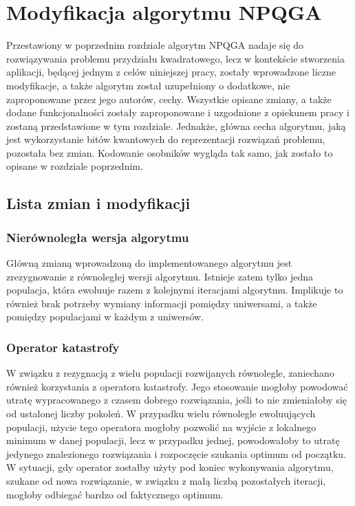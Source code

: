 \chapter{Modyfikacja algorytmu NPQGA}
\label{cha:modyfikacja}
Przestawiony w poprzednim rozdziale algorytm NPQGA nadaje się do rozwiązywania problemu przydziału kwadratowego, lecz w kontekście stworzenia aplikacji, będącej jednym z celów niniejszej pracy, zostały wprowadzone liczne modyfikacje, a także algorytm został uzupełniony o dodatkowe, nie zaproponowane przez jego autorów, cechy. Wszystkie opisane zmiany, a także dodane funkcjonalności zostały zaproponowane i uzgodnione z opiekunem pracy i zostaną przedstawione w tym rozdziale. Jednakże, główna cecha algorytmu, jaką jest wykorzystanie bitów kwantowych do reprezentacji rozwiązań problemu, pozostała bez zmian. Kodowanie osobników wygląda tak samo, jak zostało to opisane w rozdziale poprzednim.

\section{Lista zmian i modyfikacji}
\subsection{Nierównoległa wersja algorytmu}
Główną zmianą wprowadzoną do implementowanego algorytmu jest zrezygnowanie z równoległej wersji algorytmu. Istnieje zatem tylko jedna populacja, która ewoluuje razem z kolejnymi iteracjami algorytmu. Implikuje to również brak potrzeby wymiany informacji pomiędzy uniwersami, a także pomiędzy populacjami w każdym z uniwersów.

\subsection{Operator katastrofy}
W związku z rezygnacją z wielu populacji rozwijanych równolegle, zaniechano również korzystania z operatora katastrofy. Jego stosowanie mogłoby powodować utratę wypracowanego z czasem dobrego rozwiązania, jeśli to nie zmieniałoby się od ustalonej liczby pokoleń. W przypadku wielu równolegle ewoluujących populacji, użycie tego operatora mogłoby pozwolić na wyjście z lokalnego minimum w danej populacji, lecz w przypadku jednej, powodowałoby to utratę jedynego znalezionego rozwiązania i rozpoczęcie szukania optimum od początku. W sytuacji, gdy operator zostałby użyty pod koniec wykonywania algorytmu, szukane od nowa rozwiązanie, w związku z małą liczbą pozostałych iteracji, mogłoby odbiegać bardzo od faktycznego optimum.

